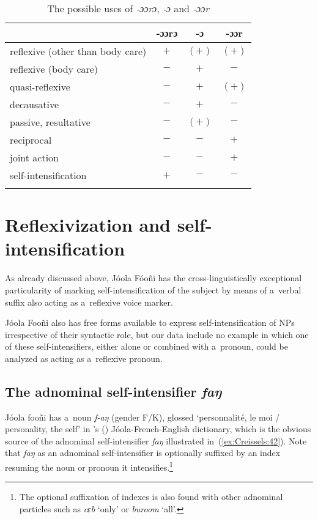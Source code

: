 \documentclass[output=paper]{langscibook}
\begin{document}
\begin{table}[ht]
  \centering
  \begin{tabular}{lccc}
    \lsptoprule
    & {‑ɔɔrɔ} & {‑ɔ} & {‑ɔɔr} \\
    \hline
    {reflexive (other than body care)} & $+$ & $(+)$ & $(+)$ \\
    {reflexive (body care)} & $-$ & $+$ & $-$ \\
    {quasi-reflexive} & $-$ & $+$ & $(+)$ \\
    {decausative} & $-$ & $+$ & $-$ \\
    {passive, resultative} & $-$ & $(+)$ & $-$ \\
    {reciprocal} & $-$ & $-$ & $+$ \\
    {joint action} & $-$ & $-$ & $+$ \\
    {self-intensification} & $+$ & $-$ & $-$ \\
    \lspbottomrule
  \end{tabular}
  \caption{The possible uses of \textit{‑ɔɔrɔ}, \textit{‑ɔ} and \textit{‑ɔɔr}}%
  \label{tab:Creissels:verb-marker-summary}
\end{table}


\section{Reflexivization and self-intensification}%
\label{sec:Creissels:refl-and-self-intens}

As already discussed above, Jóola Fóoñi has the cross-linguistically
exceptional particularity of marking self-intensification of the subject by
means of a~verbal suffix also acting as a~reflexive voice marker.

Jóola Fooñi also has free forms available to express self-intensification of
NPs irrespective of their syntactic role, but our data include no example in
which one of these self-intensifiers, either alone or combined with a~pronoun,
could be analyzed as acting as a~reflexive pronoun.

\subsection{The adnominal self-intensifier \textit{faŋ}}%
\label{sec:Creissels:fang}

Jóola fooñi has a~noun \textit{f-aŋ} (gender F/K), glossed `personnalité, le moi
/ personality, the self' in \citeauthor{SapirEtAl1993}'s
(\citeyear{SapirEtAl1993}) Jóola-French-English dictionary, which is the
obvious source of the adnominal self-intensifier \textit{faŋ} illustrated
in~(\ref{ex:Creissels:42}).  Note that \textit{faŋ} as an adnominal self-intensifier is
optionally suffixed by an index resuming the noun or pronoun it
intensifies.\footnote{The optional suffixation of indexes is also found with other adnominal particles such as \textit{cɛb} `only' or \textit{buroom} `all'. }
\end{document}
